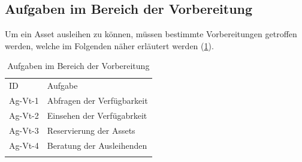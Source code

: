 \subsection{Aufgaben im Bereich der Vorbereitung}
Um ein Asset ausleihen zu können, müssen bestimmte Vorbereitungen getroffen werden, welche im
Folgenden näher erläutert werden (\ref{table:Ag-Vt}).

\begin{table}[h]
        \centering
        \caption{Aufgaben im Bereich der Vorbereitung}
        \begin{tabular}{ll}
                \arrayrulecolor{maincolor}\hline
                \sffamily\color{maincolor}ID & \sffamily\color{maincolor}Aufgabe \\
                \arrayrulecolor{maincolor}\hline
                Ag-Vt-1                      & Abfragen der Verfügbarkeit \\
                Ag-Vt-2                      & Einsehen der Verfügabrkeit \\
                Ag-Vt-3                      & Reservierung der Assets \\
                Ag-Vt-4                      & Beratung der Ausleihenden \\
                \arrayrulecolor{maincolor}\hline
        \end{tabular}
        \label{table:Ag-Vt}
\end{table}

